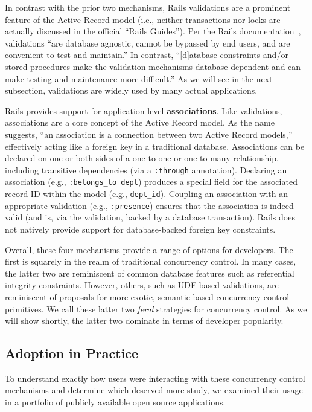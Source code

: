 \begin{myenumerate}
In contrast with the prior two mechanisms, Rails validations are a
prominent feature of the Active Record model (i.e., neither
transactions nor locks are actually discussed in the official ``Rails
Guides''). Per the Rails documentation~\cite{rails-guide}, validations ``are database
agnostic, cannot be bypassed by end users, and are convenient to test
and maintain.'' In contrast, ``[d]atabase constraints and/or stored procedures make the
validation mechanisms database-dependent and can make testing and
maintenance more difficult.'' As we will see in the next subsection,
validations are widely used by many actual applications.

\item Rails provides support for application-level
\textbf{associations}. Like validations, associations are a core
concept of the Active Record model. As the name suggests, ``an
association is a connection between two Active Record models,''
effectively acting like a foreign key in a traditional
database. Associations can be declared on one or both sides of a
one-to-one or one-to-many relationship, including transitive
dependencies (via a \texttt{:through} annotation). Declaring an
association (e.g., \texttt{:belongs\_to dept}) produces a special field
for the associated record ID within the model (e.g.,
\texttt{dept\_id}). Coupling an association with an appropriate
validation (e.g., \texttt{:presence}) ensures that the association is
indeed valid (and is, via the validation, backed by a database
transaction). Rails does not natively provide support for
database-backed foreign key constraints.
\end{myenumerate}

Overall, these four mechanisms provide a range of options for
developers. The first is squarely in the realm of traditional
concurrency control. In many cases, the latter two are reminiscent of
common database features such as referential integrity
constraints. However, others, such as UDF-based validations, are
reminiscent of proposals for more exotic, semantic-based concurrency
control primitives. We call these latter two \textit{feral} strategies
for concurrency control. As we will show shortly, the latter two
dominate in terms of developer popularity.

\subsection{Adoption in Practice}

To understand exactly how users were interacting with these
concurrency control mechanisms and determine which deserved more
study, we examined their usage in a portfolio of publicly available
open source applications.

